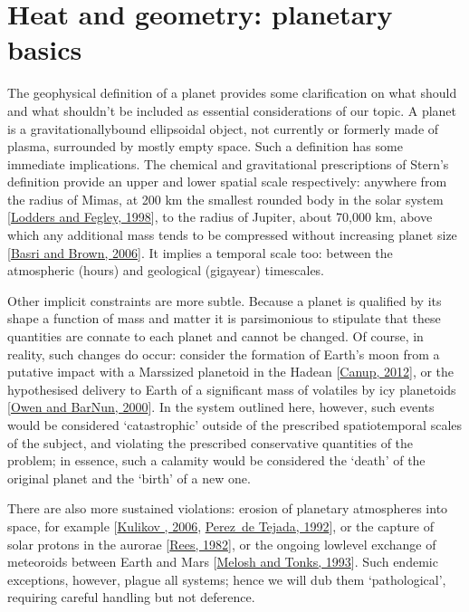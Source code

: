 \documentclass[letterpaper,10pt,english]{jupyterBook}
\begin{document}
\section{Heat and geometry: planetary basics}
\label{\detokenize{content/chapter_01_background/main:heat-and-geometry-planetary-basics}}
\sphinxAtStartPar
The geophysical definition of a planet provides some clarification on what should and what shouldn’t be included as essential considerations of our topic. A planet is a gravitationally\sphinxhyphen{}bound ellipsoidal object, not currently or formerly made of plasma, surrounded by mostly empty space. Such a definition has some immediate implications. The chemical and gravitational prescriptions of Stern’s definition provide an upper and lower spatial scale respectively: anywhere from the radius of Mimas, at 200 km the smallest rounded body in the solar system {[}\hyperlink{cite.references:id292}{Lodders and Fegley, 1998}{]}, to the radius of Jupiter, about 70,000 km, above which any additional mass tends to be compressed without increasing planet size {[}\hyperlink{cite.references:id640}{Basri and Brown, 2006}{]}. It implies a temporal scale too: between the atmospheric (hours) and geological (gigayear) timescales.

\sphinxAtStartPar
Other implicit constraints are more subtle. Because a planet is qualified by its shape \sphinxhyphen{} a function of mass and matter \sphinxhyphen{} it is parsimonious to stipulate that these quantities are connate to each planet and cannot be changed. Of course, in reality, such changes do occur: consider the formation of Earth’s moon from a putative impact with a Mars\sphinxhyphen{}sized planetoid in the Hadean {[}\hyperlink{cite.references:id345}{Canup, 2012}{]}, or the hypothesised delivery to Earth of a significant mass of volatiles by icy planetoids {[}\hyperlink{cite.references:id346}{Owen and Bar\sphinxhyphen{}Nun, 2000}{]}. In the system outlined here, however, such events would be considered ‘catastrophic’ \sphinxhyphen{} outside of the prescribed spatiotemporal scales of the subject, and violating the prescribed conservative quantities of the problem; in essence, such a calamity would be considered the ‘death’ of the original planet and the ‘birth’ of a new one.

\sphinxAtStartPar
There are also more sustained violations: erosion of planetary atmospheres into space, for example {[}\hyperlink{cite.references:id644}{Kulikov , 2006}, \hyperlink{cite.references:id643}{Perez de Tejada, 1992}{]}, or the capture of solar protons in the aurorae {[}\hyperlink{cite.references:id642}{Rees, 1982}{]}, or the ongoing low\sphinxhyphen{}level exchange of meteoroids between Earth and Mars {[}\hyperlink{cite.references:id641}{Melosh and Tonks, 1993}{]}. Such endemic exceptions, however, plague all systems; hence we will dub them ‘pathological’, requiring careful handling but not deference.
\end{document}
